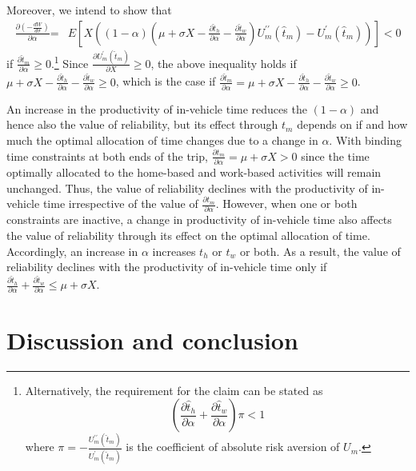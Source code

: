 \documentclass[12pt,a4paper,british]{article}
\makeatletter
\newenvironment{proof}[1][\proofname]{\par
    \normalfont\topsep6\p@\@plus6\p@\relax
    \trivlist
    \itemindent\parindent
    \item[\hskip\labelsep
          \scshape
      #1]\ignorespaces
  }{%
    \endtrivlist\@endpefalse
  }
\providecommand{\proofname}{Proof}
\makeatother
\begin{document}
\begin{proof}
Moreover, we intend to show that
\begin{align*}
\frac{\partial\left(-\frac{dW}{d\sigma}\right)}{\partial\alpha}\text{=} & E\left[X\left(\left(1-\alpha\right)\left(\mu+\sigma X-\frac{\partial\hat{t}_{h}}{\partial\alpha}-\frac{\partial\hat{t}_{w}}{\partial\alpha}\right)U_{m}^{\prime\prime}\left(\hat{t}_{m}\right)-U_{m}^{\prime}\left(\hat{t}_{m}\right)\right)\right]<0
\end{align*}
if $\frac{\partial\hat{t}_{m}}{\partial\alpha}\geq0$.\footnote{Alternatively, the requirement for the claim can be stated as%
\begin{equation*}
\left(\frac{\partial\hat{t}_{h}}{\partial\alpha}+\frac{\partial\hat{t}_{w}}{\partial\alpha}\right)\pi<1
\end{equation*}%
where $\pi=-\frac{U_{m}^{\prime\prime}\left(\hat{t}_{m}\right)}{U_{m}^{\prime}\left(\hat{t}_{m}\right)}$ is the coefficient of absolute risk aversion of $U_{m}$.} Since $\frac{\partial U_{m}^{\prime}\left(\hat{t}_{m}\right)}{\partial X}\geq0$, the above inequality holds if $\mu+\sigma X-\frac{\partial\hat{t}_{h}}{\partial\alpha}-\frac{\partial\hat{t}_{w}}{\partial\alpha}\geq0$, which is the case if $\frac{\partial\hat{t}_{m}}{\partial\alpha}=\mu+\sigma X-\frac{\partial\hat{t}_{h}}{\partial\alpha}-\frac{\partial\hat{t}_{w}}{\partial\alpha}\geq0$.
\end{proof}

An increase in the productivity of in-vehicle time reduces the $\left(1-\alpha\right)$ and hence also the value of reliability, but its effect through $t_{m}$ depends on if and how much the optimal allocation of time changes due to a change in $\alpha$. With binding time constraints at both ends of the trip, $\frac{\partial t_{m}}{\partial\alpha}=\mu+\sigma X>0$ since the time optimally allocated to the home-based and work-based activities will remain unchanged. Thus, the value of reliability declines with the productivity of in-vehicle time irrespective of the value of $\frac{\partial t_{m}}{\partial\alpha}$. However, when one or both constraints are inactive, a change in productivity of in-vehicle time also affects the value of reliability through its effect on the optimal allocation of time. Accordingly, an increase in $\alpha$ increases $t_{h}$ or $t_{w}$ or both. As a result, the value of reliability declines with the productivity of in-vehicle time only if $\frac{\partial\hat{t}_{h}}{\partial\alpha}+\frac{\partial\hat{t}_{w}}{\partial\alpha}\leq\mu+\sigma X$.


\section{Discussion and conclusion}
\end{document}

